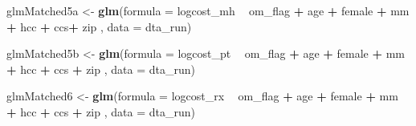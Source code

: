 \documentclass[]{article}
\newenvironment{Shaded}{\begin{snugshade}}{\end{snugshade}}
\newcommand{\KeywordTok}[1]{\textcolor[rgb]{0.13,0.29,0.53}{\textbf{#1}}}
\newcommand{\DataTypeTok}[1]{\textcolor[rgb]{0.13,0.29,0.53}{#1}}
\newcommand{\StringTok}[1]{\textcolor[rgb]{0.31,0.60,0.02}{#1}}
\newcommand{\OperatorTok}[1]{\textcolor[rgb]{0.81,0.36,0.00}{\textbf{#1}}}
\newcommand{\NormalTok}[1]{#1}
\begin{document}
\begin{Shaded}
\begin{Highlighting}[]
\NormalTok{glmMatched5a <-}\StringTok{ }\KeywordTok{glm}\NormalTok{(}\DataTypeTok{formula =}\NormalTok{ logcost_mh }\OperatorTok{~}\StringTok{ }\NormalTok{om_flag }\OperatorTok{+}\StringTok{ }\NormalTok{age }\OperatorTok{+}\StringTok{ }\NormalTok{female }\OperatorTok{+}\StringTok{ }\NormalTok{mm }\OperatorTok{+}\StringTok{ }\NormalTok{hcc }\OperatorTok{+}\StringTok{ }\NormalTok{ccs}\OperatorTok{+}\StringTok{ }\NormalTok{zip  ,}
                    \DataTypeTok{data    =}\NormalTok{ dta_run)}


\NormalTok{glmMatched5b <-}\StringTok{ }\KeywordTok{glm}\NormalTok{(}\DataTypeTok{formula =}\NormalTok{ logcost_pt }\OperatorTok{~}\StringTok{ }\NormalTok{om_flag }\OperatorTok{+}\StringTok{ }\NormalTok{age }\OperatorTok{+}\StringTok{ }\NormalTok{female }\OperatorTok{+}\StringTok{ }\NormalTok{mm }\OperatorTok{+}\StringTok{ }\NormalTok{hcc }\OperatorTok{+}\StringTok{ }\NormalTok{ccs }\OperatorTok{+}\StringTok{ }\NormalTok{zip ,}
                    \DataTypeTok{data    =}\NormalTok{ dta_run)}


\NormalTok{glmMatched6 <-}\StringTok{ }\KeywordTok{glm}\NormalTok{(}\DataTypeTok{formula =}\NormalTok{ logcost_rx }\OperatorTok{~}\StringTok{ }\NormalTok{om_flag }\OperatorTok{+}\StringTok{ }\NormalTok{age }\OperatorTok{+}\StringTok{ }\NormalTok{female }\OperatorTok{+}\StringTok{ }\NormalTok{mm }\OperatorTok{+}\StringTok{ }\NormalTok{hcc }\OperatorTok{+}\StringTok{ }\NormalTok{ccs }\OperatorTok{+}\StringTok{ }\NormalTok{zip ,}
                   \DataTypeTok{data    =}\NormalTok{ dta_run)}



\end{Highlighting}
\end{Shaded}
\end{document}
